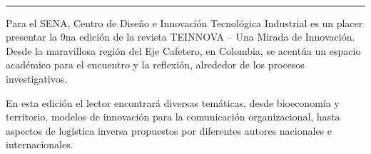 \begin{textblock*}{68mm}
{\begin{minipage}[t]{68mm}
{\href{https://www.facebook.com/sharer/sharer.php?u=https%3A%2F%2Fwww.dropbox.com%2Fscl%2Ffi%2From8ermbyet1p606ms6y0%2Fl-01-EDITORIAL.pdf%3Frlkey%3Dx341kromqoa6a1fyx499z5yj2%26st%3Dmknhry7g%26dl%3D1}{}~
\href{https://www.linkedin.com/sharing/share-offsite/?url=https%3A%2F%2Fwww.dropbox.com%2Fscl%2Ffi%2From8ermbyet1p606ms6y0%2Fl-01-EDITORIAL.pdf%3Frlkey%3Dx341kromqoa6a1fyx499z5yj2%26st%3Dmknhry7g%26dl%3D1}{}~
\href{https://www.reddit.com/submit?url=https%3A%2F%2Fwww.dropbox.com%2Fscl%2Ffi%2From8ermbyet1p606ms6y0%2Fl-01-EDITORIAL.pdf%3Frlkey%3Dx341kromqoa6a1fyx499z5yj2%26st%3Dmknhry7g%26dl%3D1&title=Editorial}{}~
\href{https://www.researchgate.net/search?q=Editorial}{}~
\href{https://t.me/share/url?url=https%3A%2F%2Fwww.dropbox.com%2Fscl%2Ffi%2From8ermbyet1p606ms6y0%2Fl-01-EDITORIAL.pdf%3Frlkey%3Dx341kromqoa6a1fyx499z5yj2%26st%3Dmknhry7g%26dl%3D1&text=Editorial}{}~
\href{https://wa.me/?text=https%3A%2F%2Fwww.dropbox.com%2Fscl%2Ffi%2From8ermbyet1p606ms6y0%2Fl-01-EDITORIAL.pdf%3Frlkey%3Dx341kromqoa6a1fyx499z5yj2%26st%3Dmknhry7g%26dl%3D1}{}~
\href{https://twitter.com/intent/tweet?url=https%3A%2F%2Fwww.dropbox.com%2Fscl%2Ffi%2From8ermbyet1p606ms6y0%2Fl-01-EDITORIAL.pdf%3Frlkey%3Dx341kromqoa6a1fyx499z5yj2%26st%3Dmknhry7g%26dl%3D1&text=Editorial}{}
}\par
\end{minipage}%
}%
\end{textblock*}


\bigskip
\noindent\rule{\linewidth}{0.4pt}
\bigskip

Para el SENA, Centro de Diseño e Innovación Tecnológica Industrial es un placer presentar la 9na edición de la revista TEINNOVA – Una Mirada de Innovación. Desde la maravillosa región del Eje Cafetero, en Colombia, se acentúa un espacio académico para el encuentro y la reflexión, alrededor de los procesos investigativos.

En esta edición el lector encontrará diversas temáticas, desde bioeconomía y territorio, modelos de innovación para la comunicación organizacional, hasta aspectos de logística inversa propuestos por diferentes autores nacionales e internacionales.

